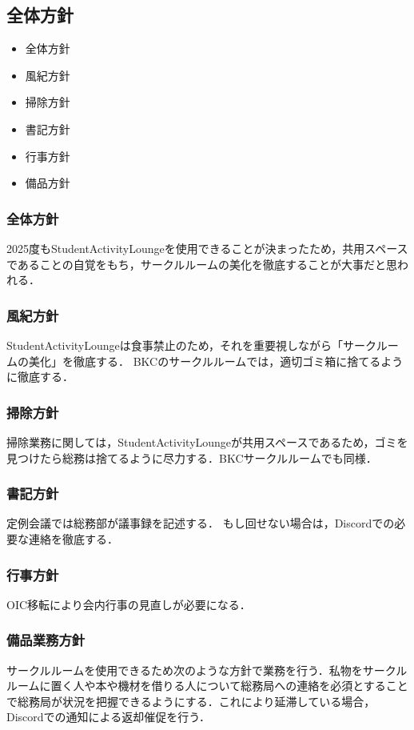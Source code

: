 \subsection*{全体方針}


\begin{itemize}
	\item 全体方針
	\item 風紀方針
	\item 掃除方針
	\item 書記方針
	\item 行事方針
	\item 備品方針
\end{itemize}

\subsubsection*{全体方針}
2025度もStudentActivityLoungeを使用できることが決まったため，共用スペースであることの自覚をもち，サークルルームの美化を徹底することが大事だと思われる．

\subsubsection*{風紀方針}
StudentActivityLoungeは食事禁止のため，それを重要視しながら「サークルームの美化」を徹底する．
BKCのサークルルームでは，適切ゴミ箱に捨てるように徹底する．

\subsubsection*{掃除方針}
掃除業務に関しては，StudentActivityLoungeが共用スペースであるため，ゴミを見つけたら総務は捨てるように尽力する．BKCサークルルームでも同様．

\subsubsection*{書記方針}
定例会議では総務部が議事録を記述する．
もし回せない場合は，Discordでの必要な連絡を徹底する．

\subsubsection*{行事方針}
OIC移転により会内行事の見直しが必要になる．

\subsubsection*{備品業務方針}
サークルルームを使用できるため次のような方針で業務を行う．私物をサークルルームに置く人や本や機材を借りる人について総務局への連絡を必須とすることで総務局が状況を把握できるようにする．これにより延滞している場合，Discordでの通知による返却催促を行う．
